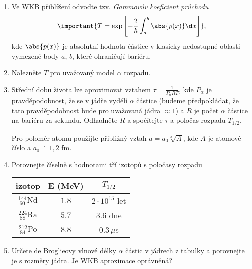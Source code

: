 	\begin{enumerate}
		\item 
			Ve WKB přiblížení odvoďte tzv. \emph{Gammovův koeficient průchodu}
			\begin{equation}
				\label{eq:Gammov}
				\important{
					T=\exp\left[-{\frac{2}{\hbar}}\int_{a}^{b}\abs{p(x)}\d x\right]
				},
			\end{equation}
			kde $\abs{p(x)}$ je absolutní hodnota  částice v klasicky nedostupné oblasti vymezené body $a$, $b$, které ohraničují bariéru.
		
		\item				
			Nalezněte $T$ pro uvažovaný model $\alpha$ rozpadu.
		
		\item
			Střední dobu života lze aproximovat vztahem $\tau=\frac{1}{P_{\alpha}RT}$, kde $P_{\alpha}$ je pravděpodobnost,
			že se v jádře vydělí $\alpha$ částice (budeme předpokládat, že tato pravděpodobnost bude
			pro uvažovaná jádra $\approx1$) a $R$ je počet  $\alpha$ částice na bariéru za sekundu.
			Odhadněte $R$ a spočítejte $\tau$ a poločas rozpadu $T_{1/2}$.
		
		Pro poloměr atomu použijte přibližný vztah $a=a_{0}\sqrt[3]{A}$, kde $A$ je atomové číslo a $a_{0}\doteq1,\!2$ fm.
		
		\item
			Porovnejte číselně s hodnotami tří izotopů s poločasy rozpadu
			
			\begin{center}
				\begin{tabular}{|c|c|c|}
					\hline
					izotop & E (MeV) & $T_{1/2}$\\
					\hline
					\hline
					$^{144}_{\ 60}{\text{Nd}}$ & $1.8$ & $2\cdot10^{15}$ let\\
					\hline
					$^{224}_{\ 88}{\text{Ra}}$ & $5.7$ & $3.6$ dne\\
					\hline
					$^{212}_{\ 84}{\text{Po}}$ & $8.8$ & $0.3\,\mu$s\\
					\hline
				\end{tabular}
			\end{center}
		
		\item
			Určete de Broglieovy vlnové délky $\alpha$ částic v jádrech z tabulky a porovnejte je s rozměry jádra.
			Je WKB aproximace oprávněná?
		
	\end{enumerate}
	

